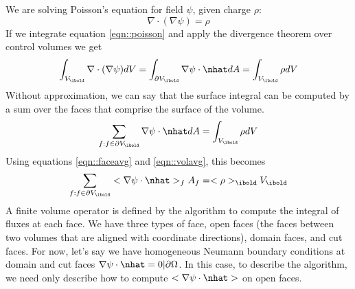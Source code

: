 \documentclass{article}
\begin{document}
We are solving Poisson's equation for field $\psi$, given charge $\rho$:
\begin{equation}
  \nabla \cdot (\nabla \psi) = \rho
  \label{eqn::poisson}
\end{equation}
If we integrate equation \ref{eqn::poisson} and apply the divergence theorem 
over control volumes we get
\begin{equation}
\int_{V_\ibold} \nabla \cdot (\nabla \psi ) dV = \int_{\partial
  V_\ibold} \nabla \psi\cdot \nhat  dA = \int_{V_\ibold} \rho dV
\end{equation}
Without approximation, we can say that the surface integral can be
computed by a sum over the faces that comprise the surface of the
volume.
\begin{equation}
\sum_{f: f \in \partial V_\ibold} \nabla \psi \cdot \nhat dA = \int_{V_\ibold} \rho dV
\end{equation}
Using equations \ref{eqn::faceavg} and \ref{eqn::volavg}, this becomes 
\begin{equation}
\sum_{f: f \in \partial V_\ibold} <\nabla \psi \cdot \nhat>_f A_f
= <\rho>_\ibold V_\ibold
\label{eqn::discretePoisson}
\end{equation}
A finite volume operator is defined by the algorithm to compute the
integral of fluxes at each face.  We have three types of face, open
faces (the faces between two volumes that are aligned with coordinate
directions), domain faces, and cut faces.  For now, let's say we have
homogeneous Neumann boundary conditions at domain and cut faces
$\nabla \psi \cdot \nhat = 0 |\partial \Omega$.  In this case, to
describe the algorithm, we need only describe how to compute 
$<\nabla\psi \cdot \nhat>$ on open faces.
\end{document}
